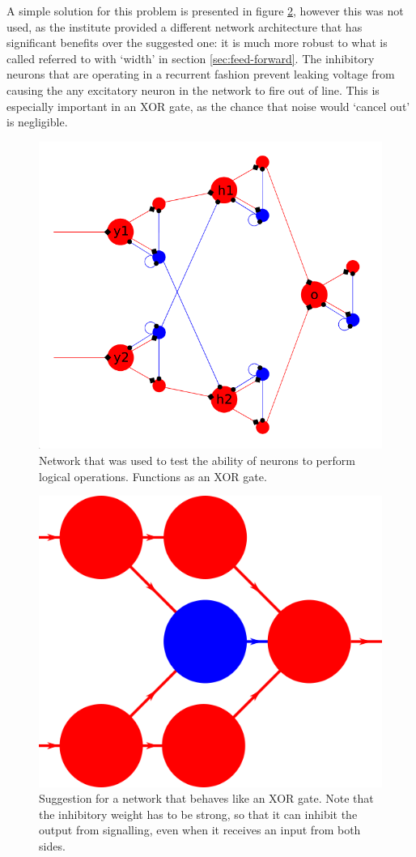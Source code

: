 \documentclass[10pt,a4paper]{article}
\begin{document}
A simple solution for this problem is presented in figure
\ref{fig:XOR-suggested}, however this was not used, as the institute provided a
different network architecture that has significant benefits over the suggested
one: it is much more robust to what is called referred to with `width' in
section \ref{sec:feed-forward}. The inhibitory neurons that are operating in a
recurrent fashion prevent leaking voltage from causing the any excitatory neuron
in the network to fire out of line. This is especially important in an XOR gate,
as the chance that noise would `cancel out' is negligible.

\begin{figure}
    \centering
    \includegraphics[width=\textwidth]{figures/XOR-used.png}
    \caption{Network that was used to test the ability of neurons to perform
        logical operations. Functions as an XOR gate.}
    \label{fig:XOR-used}
\end{figure}

\begin{figure}
    \centering
    \includegraphics[width=.3\textwidth]{figures/XOR-suggested.png}
    \caption{Suggestion for a network that behaves like an XOR gate. Note that
        the inhibitory weight has to be strong, so that it can inhibit the output
        from signalling, even when it receives an input from both sides.}
    \label{fig:XOR-suggested}
\end{figure}
\end{document}
